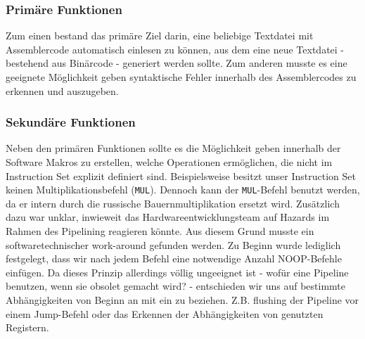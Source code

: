 \documentclass[paper=a4,fontsize=12pt,twocolumn]{scrreprt}
\begin{document}
\subsubsection{Primäre Funktionen}
Zum einen bestand das primäre Ziel darin, eine beliebige Textdatei mit Assemblercode automatisch einlesen zu können, aus dem eine neue Textdatei - bestehend aus Binärcode - generiert werden sollte. Zum anderen musste es eine geeignete Möglichkeit geben syntaktische Fehler innerhalb des Assemblercodes zu erkennen und auszugeben.

\subsubsection{Sekundäre Funktionen}
Neben den primären Funktionen sollte es die Möglichkeit geben innerhalb der Software Makros zu erstellen, welche Operationen ermöglichen, die nicht im Instruction Set explizit definiert sind. Beispielsweise besitzt unser Instruction Set keinen Multiplikationsbefehl (\texttt{MUL}).
Dennoch kann der \texttt{MUL}-Befehl benutzt werden, da er intern durch die russische Bauernmultiplikation ersetzt wird.
Zusätzlich dazu war unklar, inwieweit das Hardwareentwicklungsteam auf Hazards im Rahmen des Pipelining reagieren könnte. Aus diesem Grund musste ein softwaretechnischer work-around gefunden werden. 
Zu Beginn wurde lediglich festgelegt, dass wir nach jedem Befehl eine notwendige Anzahl NOOP-Befehle einfügen.
Da dieses Prinzip allerdings völlig ungeeignet ist - wofür eine Pipeline benutzen, wenn sie obsolet gemacht wird? - entschieden wir uns auf bestimmte Abhängigkeiten von Beginn an mit ein zu beziehen.
Z.B. flushing der Pipeline vor einem Jump-Befehl oder das Erkennen der Abhängigkeiten von genutzten Registern.
\end{document}
